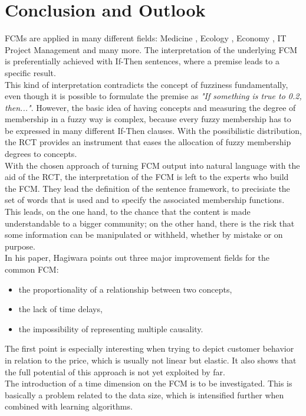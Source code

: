 \documentclass[conference]{IEEEtran}
\begin{document}
\section{Conclusion and Outlook}
\label{sec:conclusion}
FCMs are applied in many different fields: Medicine \cite{georgopoulos2003}, Ecology \cite{ozesmi2004}, Economy \cite{carvalho2004}, IT Project Management \cite{rodriguez2007} and many more. The interpretation of the underlying FCM is preferentially achieved with If-Then sentences, where a premise leads to a specific result.\\
This kind of interpretation contradicts the concept of fuzziness fundamentally, even though it is possible to formulate the premise as \emph{"If something is true to 0.2, then..."}. However, the basic idea of having concepts and measuring the degree of membership in a fuzzy way is complex, because every fuzzy membership has to be expressed in many different If-Then clauses. With the possibilistic distribution, the RCT provides an instrument that eases the allocation of fuzzy membership degrees to concepts.\\
With the chosen approach of turning FCM output into natural language with the aid of the RCT, the interpretation of the FCM is left to the experts who build the FCM. They lead the definition of the sentence framework, to precisiate the set of words that is used and to specify the associated membership functions. This leads, on the one hand, to the chance that the content is made understandable to a bigger community; on the other hand, there is the risk that some information can be manipulated or withheld, whether by mistake or on purpose.\\
In his paper, Hagiwara \cite{hagiwara1992} points out three major improvement fields for the common FCM: 
\begin{itemize}
\item the proportionality of a relationship between two concepts, 
\item the lack of time delays,
\item the impossibility of representing multiple causality. 
\end{itemize}
The first point is especially interesting when trying to depict customer behavior in relation to the price, which is usually not linear but elastic. It also shows that the full potential of this approach is not yet exploited by far.\\
The introduction of a time dimension on the FCM is to be investigated. This is basically a problem related to the data size, which is intensified further when combined with learning algorithms.\\
\end{document}
